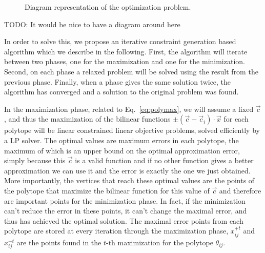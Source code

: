 \begin{figure}[h!t]
\center
{}
\caption{ Diagram representation of the optimization problem.}
\label{fig:optim} 
\end{figure}


{\large TODO: It would be nice to have a diagram around here}

In order to solve this, we propose an iterative constraint generation based algorithm which we describe in the following. First, the algorithm will iterate between two phases, one for the maximization and one for the minimization.  Second, on each phase a relaxed problem will be solved using the result from the previous phase. Finally, when a phase gives the same solution twice, the algorithm has converged and a solution to the original problem was found.

In the maximization phase, related to Eq.~\ref{eq:polymax}, we will assume a fixed $\vec{c}$, and thus the maximization of the bilinear functions $\pm(\vec{c} - \vec{c}_i)\cdot \vec{x}$ for each polytope will be linear constrained linear objective problems, solved efficiently by a LP solver. The optimal values are maximum errors in each polytope, the maximum of which is an upper bound on the optimal approximation error, simply because this $\vec{c}$ is a valid function and if no other function gives a better approximation we can use it and the error is exactly the one we just obtained. More importantly, the vertices that reach these optimal values are the points of the polytope that maximize the bilinear function for this value of $\vec{c}$ and therefore are important points for the minimization phase. In fact, if the minimization can't reduce the error in these points, it can't change the maximal error, and thus has achieved the optimal solution. The maximal error points from each polytope are stored at every iteration through the maximization phase, $x^{+t}_{ij}$ and $x^{-t}_{ij}$ are the points found in the $t$-th maximization for the polytope $\theta_{ij}$. 

